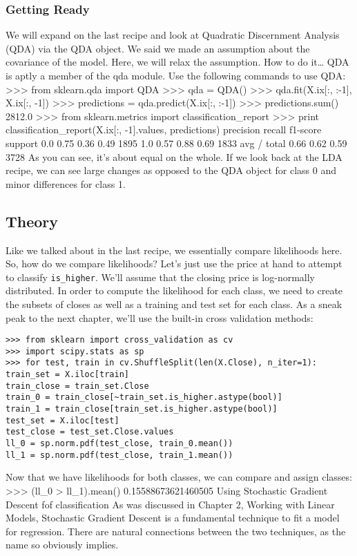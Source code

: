 \subsubsection*{Getting Ready}
We will expand on the last recipe and look at Quadratic Discernment Analysis (QDA)
via the QDA object.
We said we made an assumption about the covariance of the model. Here, we will relax
the assumption.
How to do it…
QDA is aptly a member of the qda module. Use the following commands to use QDA:
>>> from sklearn.qda import QDA
>>> qda = QDA()
>>> qda.fit(X.ix[:, :-1], X.ix[:, -1])
>>> predictions = qda.predict(X.ix[:, :-1])
>>> predictions.sum()
2812.0
>>> from sklearn.metrics import classification_report
>>> print classification_report(X.ix[:, -1].values, predictions)
precision recall f1-score support
0.0 0.75 0.36 0.49 1895
1.0 0.57 0.88 0.69 1833
avg / total 0.66 0.62 0.59 3728
As you can see, it's about equal on the whole. If we look back at the LDA recipe, we can see
large changes as opposed to the QDA object for class 0 and minor differences for class 1.

\subsection{Theory}

Like we talked about in the last recipe, we essentially compare likelihoods here. So, how do
we compare likelihoods? Let's just use the price at hand to attempt to classify \texttt{is\_higher}.
We'll assume that the closing price is log-normally distributed. In order to compute the likelihood
for each class, we need to create the subsets of closes as well as a training and test set for each
class. As a sneak peak to the next chapter, we'll use the built-in cross validation methods:
\begin{framed}
\begin{verbatim}
>>> from sklearn import cross_validation as cv
>>> import scipy.stats as sp
>>> for test, train in cv.ShuffleSplit(len(X.Close), n_iter=1):
train_set = X.iloc[train]
train_close = train_set.Close
train_0 = train_close[~train_set.is_higher.astype(bool)]
train_1 = train_close[train_set.is_higher.astype(bool)]
test_set = X.iloc[test]
test_close = test_set.Close.values
ll_0 = sp.norm.pdf(test_close, train_0.mean())
ll_1 = sp.norm.pdf(test_close, train_1.mean())
\end{verbatim}
\end{framed}
Now that we have likelihoods for both classes, we can compare and assign classes:
>>> (ll_0 > ll_1).mean()
0.15588673621460505
Using Stochastic Gradient Descent fof classification
As was discussed in Chapter 2, Working with Linear Models, Stochastic Gradient Descent is a
fundamental technique to fit a model for regression. There are natural connections between
the two techniques, as the name so obviously implies.
